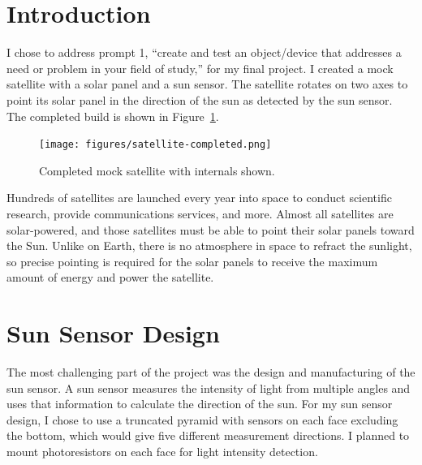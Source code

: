\FloatBarrier
\section{Introduction}
\label{sec:intro}

I chose to address prompt 1, ``create and test an object/device that addresses a need or problem in your field of study,'' for my final project. I created a mock satellite with a solar panel and a sun sensor. The satellite rotates on two axes to point its solar panel in the direction of the sun as detected by the sun sensor. The completed build is shown in Figure~\ref{fig:satellite-completed}.
\begin{figure}[!ht]
    \centering
    \texttt{[image: figures/satellite-completed.png]}
    \caption{Completed mock satellite with internals shown.}
    \label{fig:satellite-completed}
\end{figure}

Hundreds of satellites are launched every year into space to conduct scientific research, provide communications services, and more. Almost all satellites are solar-powered, and those satellites must be able to point their solar panels toward the Sun. Unlike on Earth, there is no atmosphere in space to refract the sunlight, so precise pointing is required for the solar panels to receive the maximum amount of energy and power the satellite. 



\section{Sun Sensor Design}
\label{sec:sun-sensor}

The most challenging part of the project was the design and manufacturing of the sun sensor. A sun sensor measures the intensity of light from multiple angles and uses that information to calculate the direction of the sun. For my sun sensor design, I chose to use a truncated pyramid with sensors on each face excluding the bottom, which would give five different measurement directions. I planned to mount photoresistors on each face for light intensity detection. 

